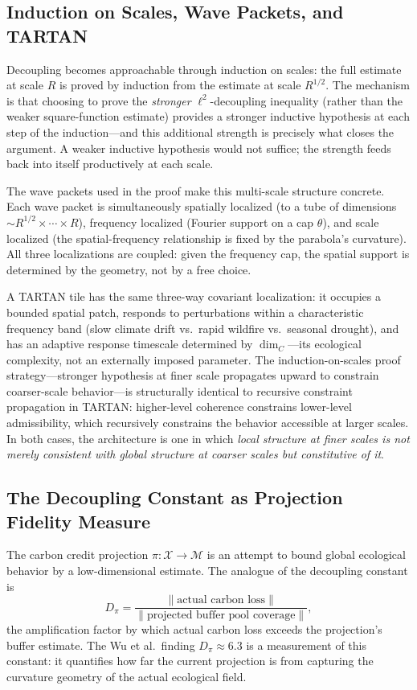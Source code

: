 \documentclass[12pt]{article}
\newcommand{\Xcal}{\mathcal{X}}
\newcommand{\Mcal}{\mathcal{M}}
\begin{document}
\subsection{Induction on Scales, Wave Packets, and TARTAN}

Decoupling becomes approachable through induction on scales: the full estimate at scale
$R$ is proved by induction from the estimate at scale $R^{1/2}$. The mechanism is that
choosing to prove the \emph{stronger} $\ell^2$-decoupling inequality (rather than the
weaker square-function estimate) provides a stronger inductive hypothesis at each step
of the induction---and this additional strength is precisely what closes the argument.
A weaker inductive hypothesis would not suffice; the strength feeds back into itself
productively at each scale.

The wave packets used in the proof make this multi-scale structure concrete. Each wave
packet is simultaneously spatially localized (to a tube of dimensions
$\sim R^{1/2}\times\cdots\times R$), frequency localized (Fourier support on a cap
$\theta$), and scale localized (the spatial-frequency relationship is fixed by the
parabola's curvature). All three localizations are coupled: given the frequency cap,
the spatial support is determined by the geometry, not by a free choice.

A TARTAN tile has the same three-way covariant localization: it occupies a bounded
spatial patch, responds to perturbations within a characteristic frequency band (slow
climate drift vs.\ rapid wildfire vs.\ seasonal drought), and has an adaptive response
timescale determined by $\dim_C$---its ecological complexity, not an externally imposed
parameter. The induction-on-scales proof strategy---stronger hypothesis at finer scale
propagates upward to constrain coarser-scale behavior---is structurally identical to
recursive constraint propagation in TARTAN: higher-level coherence constrains
lower-level admissibility, which recursively constrains the behavior accessible at
larger scales. In both cases, the architecture is one in which \emph{local structure
at finer scales is not merely consistent with global structure at coarser scales but
constitutive of it}.

\subsection{The Decoupling Constant as Projection Fidelity Measure}

The carbon credit projection $\pi:\Xcal\to\Mcal$ is an attempt to bound global
ecological behavior by a low-dimensional estimate. The analogue of the decoupling
constant is
\begin{equation}
\label{eq:decoupling-analogue}
D_\pi = \frac{\|\text{actual carbon loss}\|}{\|\text{projected buffer pool coverage}\|},
\end{equation}
the amplification factor by which actual carbon loss exceeds the projection's buffer
estimate. The Wu et al.\ finding $D_\pi\approx 6.3$ is a measurement of this constant:
it quantifies how far the current projection is from capturing the curvature geometry
of the actual ecological field.
\end{document}
